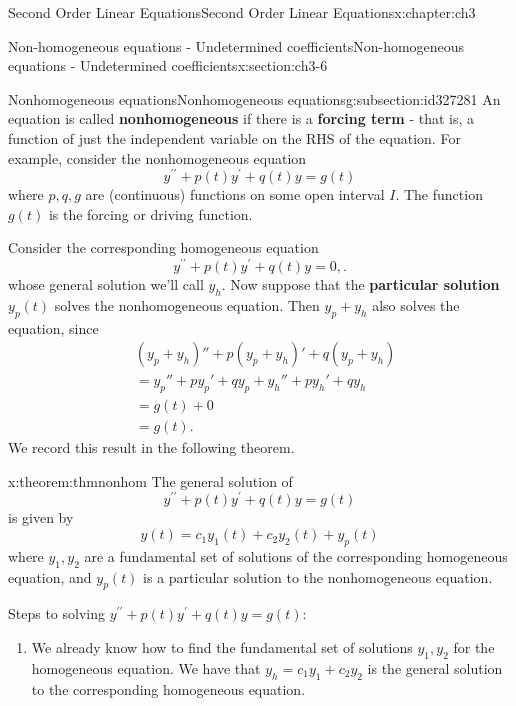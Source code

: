 \documentclass[oneside,10pt,]{book}
\newcommand{\terminology}[1]{\textbf{#1}}
\numberwithin{equation}{section}
\numberwithin{equation}{section}
\newcommand{\amp}{&}
\begin{document}
\begin{chapterptx}{Second Order Linear Equations}{}{Second Order Linear Equations}{}{}{x:chapter:ch3}
\begin{sectionptx}{Non-homogeneous equations - Undetermined coefficients}{}{Non-homogeneous equations - Undetermined coefficients}{}{}{x:section:ch3-6}
\typeout{************************************************}
%
\begin{subsectionptx}{Nonhomogeneous equations}{}{Nonhomogeneous equations}{}{}{g:subsection:id327281}
An equation is called \terminology{nonhomogeneous} if there is a \terminology{forcing term} - that is, a function of just the independent variable on the RHS of the equation. For example, consider the nonhomogeneous equation%
\begin{equation*}
y^{\prime\prime}+p(t)y^{\prime}+q(t)y=g(t)
\end{equation*}
where \(p,q,g\) are (continuous) functions on some open interval \(I\). The function \(g(t)\) is the forcing or driving function.%
\par
Consider the corresponding homogeneous equation%
\begin{equation*}
y^{\prime\prime}+p(t)y^{\prime}+q(t)y=0,.
\end{equation*}
whose general solution we'll call \(y_{h}\). Now suppose that the \terminology{particular solution} \(y_p(t)\) solves the nonhomogeneous equation. Then \(y_p + y_h\) also solves the equation, since%
\begin{align*}
\amp(y_p + y_h)'' + p(y_p + y_h)' + q(y_p + y_h)\\
\amp= y_p'' + py_p' +q y_p + y_h'' +p y_h' + qy_h \\
\amp= g(t) + 0 \\
\amp= g(t).
\end{align*}
We record this result in the following theorem.%
\begin{theorem}{}{}{x:theorem:thmnonhom}%
The general solution of%
\begin{equation*}
y^{\prime\prime}+p(t)y^{\prime}+q(t)y=g(t)
\end{equation*}
is given by%
\begin{equation*}
y(t)=c_{1}y_{1}(t)+c_{2}y_{2}(t)+y_{p}(t)
\end{equation*}
where \(y_{1},y_{2}\) are a fundamental set of solutions of the corresponding homogeneous equation, and \(y_{p}(t)\) is a particular solution to the nonhomogeneous equation.%
\end{theorem}
Steps to solving \(y^{\prime\prime}+p(t)y^{\prime}+q(t)y=g(t):\)%
\begin{enumerate}
\item{}We already know how to find the fundamental set of solutions \(y_{1},y_{2}\) for the homogeneous equation. We have that \(y_{h}=c_{1}y_{1}+c_{2}y_{2}\) is the general solution to the corresponding homogeneous equation.%

\end{enumerate}
\end{subsectionptx}
\end{sectionptx}
\end{chapterptx}
\end{document}
